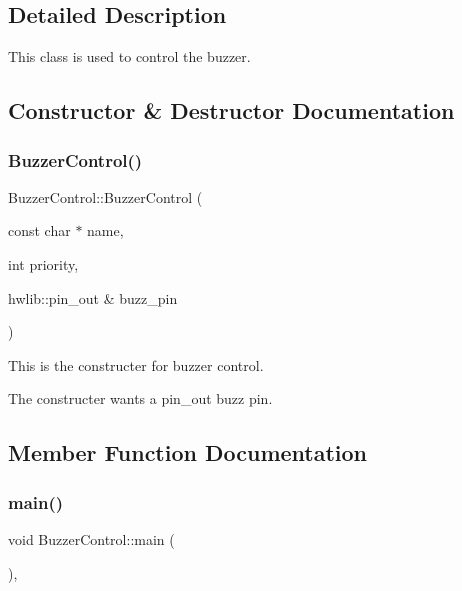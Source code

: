 \subsection{Detailed Description}
This class is used to control the buzzer. 

\subsection{Constructor \& Destructor Documentation}
\mbox{\label{class_buzzer_control_a25b3a51e33513aeeb0beb137463bbe70}} 
\subsubsection{\texorpdfstring{Buzzer\+Control()}{BuzzerControl()}}
{\footnotesize\ttfamily Buzzer\+Control\+::\+Buzzer\+Control (\begin{DoxyParamCaption}\item[{const char $\ast$}]{name,  }\item[{int}]{priority,  }\item[{hwlib\+::pin\+\_\+out \&}]{buzz\+\_\+pin }\end{DoxyParamCaption})\hspace{0.3cm}{\ttfamily [inline]}}



This is the constructer for buzzer control. 

The constructer wants a pin\+\_\+out buzz pin. 

\subsection{Member Function Documentation}
\mbox{\label{class_buzzer_control_ae249e78ba5c0399e8b14091a0a8254eb}} 
\subsubsection{\texorpdfstring{main()}{main()}}
{\footnotesize\ttfamily void Buzzer\+Control\+::main (\begin{DoxyParamCaption}{ }\end{DoxyParamCaption})\hspace{0.3cm}{\ttfamily [inline]}, {\ttfamily [override]}}



